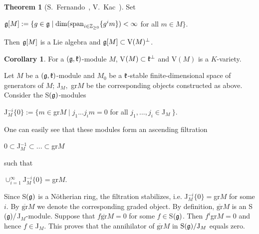 \documentclass[12pt]{amsart}
\theoremstyle{definition}\newtheorem{theorem}{Theorem}[section]
\newtheorem{corollary}[proposition]{Corollary}
\theoremstyle{definition}\newtheorem{definition}[proposition]{Definition}
\theoremstyle{remark}\newtheorem{example}[proposition]{Example}
\begin{document}
\begin{theorem}[S.~Fernando~{\cite[Cor. 2.7]{F}}, V.~Kac~\cite{Kc2}]Set \begin{center}$\frak g[M]:=\{g\in\frak g\mid\mathrm{dim}(\mathrm{span}_{i\in\mathbb Z_{\ge 0}}\{ g^im\})< \infty$ for all $m\in M\}$.\end{center} Then $\frak g[M]$ is a Lie algebra and $\frak g[M]\subset\mathrm V(M)^\bot$.\end{theorem}
\begin{corollary}For a $(\frak g, \frak k)$-module $M$, V$(M)\subset\frak k^\bot$ and V$(M)$ is a $K$-variety.\end{corollary}
Let $M$ be a $(\frak g, \frak k)$-module and $M_0$ be a $\frak k$-stable finite-dimensional space of generators of $M$; J$_M,$ gr$M$ be the corresponding objects constructed as above. Consider the S$(\frak g)$-modules\begin{center}  J$_M^{-i}\{0\}:=\{m\in$gr$M\mid j_1...j_im=0$ for all $j_1,...,j_i\in$J$_M~\}$.\end{center} One can easily see that these modules form an ascending filtration\begin{center}$0\subset$J$_M^{-1}\subset...\subset$gr$M$\end{center}such that \begin{center}$\cup_{i=1}^\infty$J$_M^{-i}\{0\}=$gr$M$.\end{center} Since S$(\frak g)$ is a N\"otherian ring, the filtration stabilizes, i.e. J$_M^{-i}\{0\}=$gr$M$ for some $i$. By $\overline{\mathrm{gr}}M$ we denote the corresponding graded object. By definition, $\overline{\mathrm{gr}}M$ is an S$(\frak g)/$J$_M$-module. Suppose that $f\overline{\mathrm{gr}}M=0$ for some $f\in$S$(\frak g)$. Then $f^i$gr$M=0$ and hence $f\in$J$_M$. This proves that the annihilator of $\mathrm{\overline{gr}}M$ in $\mathrm S(\frak g)/\mathrm J_M$ equals zero.
\end{document}
